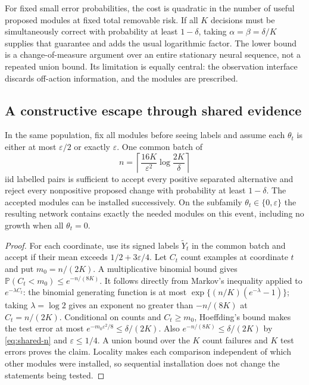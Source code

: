 For fixed small error probabilities, the cost is quadratic in the number
of useful proposed modules at fixed total removable risk. If all $K$
decisions must be simultaneously correct with probability at least
$1-\delta$, taking $\alpha=\beta=\delta/K$ supplies that guarantee and
adds the usual logarithmic factor. The lower bound is a change-of-measure
argument over an entire stationary neural sequence, not a repeated union
bound. Its limitation is equally central: the observation interface
discards off-action information, and the modules are prescribed.

\subsection{A constructive escape through shared evidence}

\begin{theorem}
\label{thm:shared-evidence}
In the same population, fix all modules before seeing labels and assume
each $\theta_t$ is either at most $\varepsilon/2$ or exactly $\varepsilon$.
One common batch of
\begin{equation}
 n=\left\lceil\frac{16K}{\varepsilon^2}\log\frac{2K}{\delta}\right\rceil
 \label{eq:shared-n}
\end{equation}
iid labelled pairs is sufficient to accept every positive separated
alternative and reject every nonpositive proposed change with probability
at least $1-\delta$. The accepted modules can be installed successively.
On the subfamily $\theta_t\in\{0,\varepsilon\}$ the resulting network
contains exactly the needed modules on this event, including no growth
when all $\theta_t=0$.
\end{theorem}
\begin{proof}
For each coordinate, use its signed labels $\widetilde Y_t$ in the common
batch and accept if their mean exceeds $1/2+3\varepsilon/4$.
Let $C_t$ count examples at coordinate
$t$ and put $m_0=n/(2K)$. A multiplicative binomial bound gives
$\mathbb P(C_t<m_0)\le e^{-n/(8K)}$.
It follows directly from Markov's inequality applied to
$e^{-\lambda C_t}$: the binomial generating function is at most
$\exp\{(n/K)(e^{-\lambda}-1)\}$; taking $\lambda=\log2$ gives
an exponent no greater than $-n/(8K)$ at $C_t=n/(2K)$.
Conditional on counts and $C_t\ge m_0$, Hoeffding's bound makes the
test error at most
$e^{-m_0\varepsilon^2/8}\le\delta/(2K)$.
Also $e^{-n/(8K)}\le\delta/(2K)$ by \eqref{eq:shared-n} and
$\varepsilon\le1/4$. A union bound over the $K$ count failures and $K$
test errors proves the claim. Locality makes each comparison independent
of which other modules were installed, so sequential installation does
not change the statements being tested.
\end{proof}

